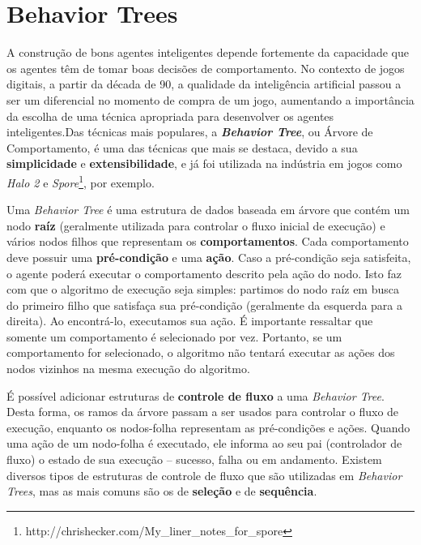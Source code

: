 \section{\label{section:behavior-trees}Behavior Trees}
A construção de bons agentes inteligentes depende fortemente da capacidade que
os agentes têm de tomar boas decisões de comportamento. No contexto de jogos
digitais, a partir da década de 90, a qualidade da inteligência artificial
passou a ser um diferencial no momento de compra de um jogo\cite[Cap.
1]{Millington:2009:AIG:1795711}, aumentando a importância da escolha de uma
técnica apropriada para desenvolver os agentes inteligentes.Das técnicas mais
populares, a \textbf{\textit{Behavior Tree}}, ou Árvore de Comportamento, é uma
das técnicas que mais se destaca, devido a sua \textbf{simplicidade} e
\textbf{extensibilidade}\cite[Cap.  4]{Rabin:2013:GAP:2566761}, e já foi
utilizada na indústria em jogos como \textit{Halo 2}\cite[Cap.
5]{Millington:2009:AIG:1795711} e
\textit{Spore}\footnote{http://chrishecker.com/My\_liner\_notes\_for\_spore},
por exemplo.

Uma \textit{Behavior Tree} é uma estrutura de dados baseada em árvore que contém
um nodo \textbf{raíz} (geralmente utilizada para controlar o fluxo inicial de
execução) e vários nodos filhos que representam os \textbf{comportamentos}. Cada
comportamento deve possuir uma \textbf{pré-condição} e uma \textbf{ação}. Caso a
pré-condição seja satisfeita, o agente poderá executar o comportamento descrito
pela ação do nodo\cite[Cap. 4]{Rabin:2013:GAP:2566761}. Isto faz com que o
algoritmo de execução seja simples: partimos do nodo raíz em busca do primeiro
filho que satisfaça sua pré-condição (geralmente da esquerda para a direita). Ao
encontrá-lo, executamos sua ação. É importante ressaltar que somente um
comportamento é selecionado por vez. Portanto, se um comportamento for
selecionado, o algoritmo não tentará executar as ações dos nodos vizinhos na
mesma execução do algoritmo.

É possível adicionar estruturas de \textbf{controle de fluxo} a uma
\textit{Behavior Tree}. Desta forma, os ramos da árvore passam a ser usados para
controlar o fluxo de execução, enquanto os nodos-folha representam as
pré-condições e ações\cite[Cap. 10]{Rabin:2015:GAP:2821138}. Quando uma ação de
um nodo-folha é executado, ele informa ao seu pai (controlador de fluxo) o
estado de sua execução -- sucesso, falha ou em andamento. Existem diversos
tipos de estruturas de controle de fluxo que são utilizadas em \textit{Behavior
Trees}, mas as mais comuns são os de \textbf{seleção} e de \textbf{sequência}.


